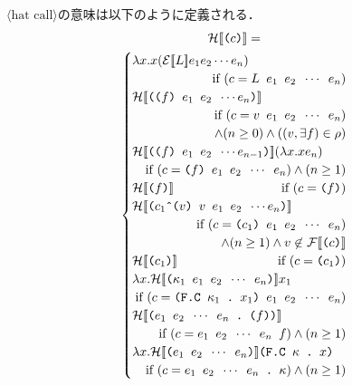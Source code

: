 \documentclass[twocolumn]{jarticle}
\def\hat{\mbox{\^{ }}}
\newcommand{\NT}[1]{\ensuremath{\langle\mbox{#1}\rangle}\allowbreak}
\newcommand{\dlrBrack}[1]{\ensuremath{[\![#1]\allowbreak\!]}}
\newcommand{\C}[1]{\mbox{\tt#1}}
\newcommand{\D}{\mbox{\tt\ .\ }}
\newcommand{\sS}[1]{\ensuremath{\mathcal{E}}\dlrBrack{\mbox{\tt#1}}}
\newcommand{\sH}[1]{\ensuremath{\mathcal{H}}\dlrBrack{\mbox{\tt#1}}}
\newcommand{\FC}[2]{\mbox{\tt F.C #1\D#2}}
\newcommand{\FV}[1]{\ensuremath{\mathcal{F}}\dlrBrack{\C{#1}}}
\begin{document}
\NT{hat call}の意味は以下のように定義される．
\begin{multline}
  \sH{($c$)}= \\
  \begin{cases}
    \lambda x.x(\sS{$L$}e_1e_2\cdots e_n) \\
    & \llap{if $(c=\C{$L\ e_1\ e_2\ \cdots\ e_n$})$} \\
    \sH{(($f$) $e_1\ e_2\ \cdots e_n$)} \\
    & \llap{if $(c=\C{$v\ e_1\  e_2\ \cdots\ e_n$})$} \\
    & \llap{$\land(n\geq 0)\land((v,\exists f)\in\rho)$} \\
    \sH{(($f$) $e_1\ e_2\ \cdots e_{n-1}$)}(\lambda x.x e_n) \\
    & \llap{if $(c=\C{($f$) $e_1\  e_2\ \cdots\ e_n$})\land(n\geq 1)$} \\
    \sH{($f$)} & \llap{if $(c=\C{($f$)})$} \\
    \sH{($c_1$\hat($v$) $v\ e_1\ e_2\ \cdots e_n$)} \\
    & \llap{if $(c=\C{($c_1$) $e_1\  e_2\ \cdots\ e_n$})$} \\
    & \llap{$\land (n\geq 1) \land v\not\in$ \FV{($c$)}} \\
    \sH{($c_1$)} & \llap{if $(c=\C{($c_1$)})$} \\
    \lambda x.\sH{($\kappa_1\ e_1\ e_2\ \cdots\ e_n$)}x_1 \\
    & \llap{if $(c=\C{(\FC{$\kappa_1$}{$x_1$}) $e_1\ e_2\ \cdots\ e_n$})$} \\
    \sH{($e_1\ e_2\ \cdots\ e_n$\D($f$))} \\
    & \llap{if $(c=\C{$e_1\ e_2\ \cdots\ e_n\ f$})\land(n\geq 1)$} \\
    \lambda x.\sH{($e_1\ e_2\ \cdots\ e_n$)}\C{(\FC{$\kappa$}{$x$})} \\
    & \llap{if $(c=\C{$e_1\ e_2\ \cdots\ e_n\D\kappa$})\land(n\geq 1)$} \\
  \end{cases}
\end{multline}
\end{document}
